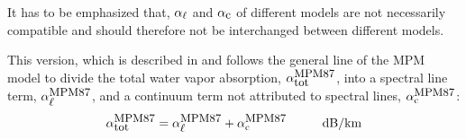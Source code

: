 {It has to be emphasized that, $\alpha_{\ell}$ and $\alpha_{\mbox{\small c}}$ of different
models are not necessarily compatible and should therefore not be 
interchanged between different models.


\label{leveld:mpm87}
This version, which is described in \cite{liebeandlayton:87} and 
follows the general line of the MPM model to divide the total 
water vapor absorption, $\alpha^{\mbox{\rm \small MPM87}}_{\mbox{\small tot}}$, into a spectral line 
term, $\alpha^{\mbox{\rm \small MPM87}}_{\mbox{\small $\ell$}}$, and a continuum term not attributed to 
spectral lines, $\alpha^{\mbox{\rm \small MPM87}}_{\rm c}$:
\begin{equation}
  \label{eq:mpm87_abs}
  \alphampmotot = \alphampmol + \alphampmoc\hspace*{10mm}\mbox{dB/km}
\end{equation}



}
